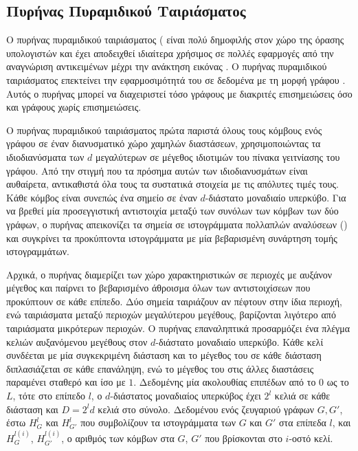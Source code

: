 \subsection{Πυρήνας Πυραμιδικού Ταιριάσματος}
\label{ssec:pm}
Ο πυρήνας πυραμιδικού ταιριάσματος ( είναι πολύ δημοφιλής στον χώρο της όρασης υπολογιστών και έχει αποδειχθεί ιδιαίτερα χρήσιμος σε πολλές εφαρμογές από την αναγνώριση αντικειμένων μέχρι την ανάκτηση εικόνας \cite{grauman2007pyramid,lazebnik2006beyond}.
Ο πυρήνας πυραμιδικού ταιριάσματος επεκτείνει την εφαρμοσιμότητά του σε δεδομένα με τη μορφή γράφου \cite{nikolentzos2017matching}.
Αυτός ο πυρήνας μπορεί να διαχειριστεί τόσο γράφους με διακριτές επισημειώσεις όσο και γράφους χωρίς επισημειώσεις.\par
Ο πυρήνας πυραμιδικού ταιριάσματος πρώτα παριστά όλους τους κόμβους ενός γράφου σε έναν διανυσματικό χώρο χαμηλών διαστάσεων, χρησιμοποιώντας τα ιδιοδιανύσματα των $d$ μεγαλύτερων σε μέγεθος ιδιοτιμών του πίνακα γειτνίασης του γράφου.
Από την στιγμή που τα πρόσημα αυτών των ιδιοδιανυσμάτων είναι αυθαίρετα, αντικαθιστά όλα τους τα συστατικά στοιχεία με τις απόλυτες τιμές τους.
Κάθε κόμβος είναι συνεπώς ένα σημείο σε έναν $d$-διάστατο μοναδιαίο υπερκύβο.
Για να βρεθεί μία προσεγγιστική αντιστοιχία μεταξύ των συνόλων των κόμβων των δύο γράφων, ο πυρήνας απεικονίζει τα σημεία σε ιστογράμματα πολλαπλών αναλύσεων () και συγκρίνει τα προκύπτοντα ιστογράμματα με μία βεβαρισμένη συνάρτηση τομής ιστογραμμάτων.\par
Αρχικά, ο πυρήνας διαμερίζει των χώρο χαρακτηριστικών σε περιοχές με αυξάνον μέγεθος και παίρνει το βεβαρισμένο άθροισμα όλων των αντιστοιχίσεων που προκύπτουν σε κάθε επίπεδο.
Δύο σημεία ταιριάζουν αν πέφτουν στην ίδια περιοχή, ενώ ταιριάσματα μεταξύ περιοχών μεγαλύτερου μεγέθους, βαρίζονται λιγότερο από ταιριάσματα μικρότερων περιοχών.
Ο πυρήνας επαναληπτικά προσαρμόζει ένα πλέγμα κελιών αυξανόμενου μεγέθους στον $d$-διάστατο μοναδιαίο υπερκύβο.
Κάθε κελί συνδέεται με μία συγκεκριμένη διάσταση και το μέγεθος του σε κάθε διάσταση διπλασιάζεται σε κάθε επανάληψη, ενώ το μέγεθος του στις άλλες διαστάσεις παραμένει σταθερό και ίσο με $1$.
Δεδομένης μία ακολουθίας επιπέδων από το $0$ ως το $L$, τότε στο επίπεδο $l$, ο $d$-διάστατος μοναδιαίος υπερκύβος έχει $2^l$ κελιά σε κάθε διάσταση και $D = 2^{l}d$ κελιά στο σύνολο.
Δεδομένου ενός ζευγαριού γράφων $G,G'$, έστω $H_{G}^{l}$ και $H_{G'}^{l}$ που συμβολίζουν τα ιστογράμματα των $G$ και $G'$ στα επίπεδα $l$, και $H_{G}^{l(i)}$, $H_{G'}^{l(i)}$, ο αριθμός των κόμβων στα $G$, $G'$ που βρίσκονται στο $i$-οστό κελί.
